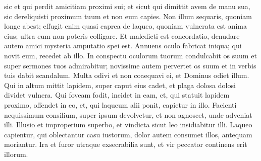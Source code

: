 \begin{biblechapter}
\begin{biblechapter}
\begin{biblechapter}
\begin{biblechapter}
\begin{biblechapter}
\begin{biblechapter}
\begin{biblechapter}
\begin{biblechapter}
\begin{biblechapter}
\begin{biblechapter}
\begin{biblechapter}
\begin{biblechapter}
\begin{biblechapter}
\begin{biblechapter}
\begin{biblechapter}
\begin{biblechapter}
\begin{biblechapter}
\begin{biblechapter}
\begin{biblechapter}
\begin{biblechapter}
\begin{biblechapter}
\begin{biblechapter}
\begin{biblechapter}
\begin{biblechapter}
\begin{biblechapter}
\begin{biblechapter}
\begin{biblechapter}
 sic et qui perdit amicitiam proximi sui;
 \verse et sicut qui dimittit avem de manu sua,
 sic dereliquisti proximum tuum et non eum capies.
 \verse Non illum sequaris, quoniam longe abest;
 effugit enim quasi caprea de laqueo,
 quoniam vulnerata est anima eius;
 \verse ultra eum non poteris colligare.
 Et maledicti est concordatio,
 \verse denudare autem amici mysteria
 amputatio spei est.
 \verse Annuens oculo fabricat iniqua;
 qui novit eum, recedet ab illo.
 \verse In conspectu oculorum tuorum condulcabit os suum
 et super sermones tuos admirabitur;
 novissime autem pervertet os suum
 et in verbis tuis dabit scandalum.
 \verse Multa odivi et non coaequavi ei,
 et Dominus odiet illum.
 \verse Qui in altum mittit lapidem, super caput eius cadet,
 et plaga dolosa dolosi dividet vulnera.
 \verse Qui foveam fodit, incidet in eam,
 et, qui statuit lapidem proximo, offendet in eo,
 et, qui laqueum alii ponit, capietur in illo.
 \verse Facienti nequissimum consilium, super ipsum devolvetur,
 et non agnoscet, unde adveniat illi.
 \verse Illusio et improperium superbo,
 et vindicta sicut leo insidiabitur illi.
 \verse Laqueo capientur, qui oblectantur casu iustorum,
 dolor autem consumet illos, antequam moriantur.
 \verse Ira et furor utraque exsecrabilia sunt,
 et vir peccator continens erit illorum.
 

\end{biblechapter}
\end{biblechapter}
\end{biblechapter}
\end{biblechapter}
\end{biblechapter}
\end{biblechapter}
\end{biblechapter}
\end{biblechapter}
\end{biblechapter}
\end{biblechapter}
\end{biblechapter}
\end{biblechapter}
\end{biblechapter}
\end{biblechapter}
\end{biblechapter}
\end{biblechapter}
\end{biblechapter}
\end{biblechapter}
\end{biblechapter}
\end{biblechapter}
\end{biblechapter}
\end{biblechapter}
\end{biblechapter}
\end{biblechapter}
\end{biblechapter}
\end{biblechapter}
\end{biblechapter}
